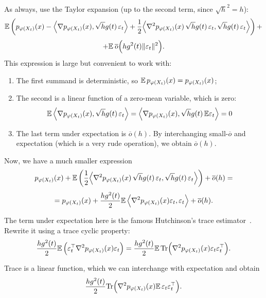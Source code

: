 As always, use the Taylor expansion (up to the second term, since $\sqrt{h}^2 = h$):
\[
    \mathbb{E}\left(p_{\varphi(X_t)}(x) - \Big\langle \nabla p_{\varphi(X_t)} (x), \sqrt{h} g(t)\, \varepsilon_t  \Big\rangle + \frac{1}{2} \Big\langle \nabla^2 p_{\varphi(X_t)}(x)\, \sqrt{h}g(t)\,\varepsilon_t, \sqrt{h}g(t)\,\varepsilon_t \Big \rangle \right) + 
\]
\[
    + \mathbb{E} \:\overline{o}\Big(h g^2(t) \|\varepsilon_t \|^2\Big).
\]
This expression is large but convenient to work with:
\begin{enumerate}
    \item The first summand is deterministic, so $\mathbb{E}\, p_{\varphi(X_t)}(x) = p_{\varphi(X_t)}(x)$;
    \item The second is a linear function of a zero-mean variable, which is zero:
    \[
        \mathbb{E}\, \Big\langle \nabla p_{\varphi(X_t)} (x), \sqrt{h} g(t)\, \varepsilon_t  \Big\rangle = \Big\langle \nabla p_{\varphi(X_t)} (x), \sqrt{h} g(t)\, \mathbb{E} \varepsilon_t  \Big\rangle = 0
    \]
    \item The last term under expectation is $\overline{o}(h)$. By interchanging small-$\overline{o}$ and expectation (which is a very rude operation), we obtain $\overline{o}(h)$.
\end{enumerate}

Now, we have a much smaller expression
\[
    p_{\varphi(X_t)}(x) + \mathbb{E}\left(\frac{1}{2} \Big\langle \nabla^2 p_{\varphi(X_t)}(x)\, \sqrt{h}g(t)\,\varepsilon_t, \sqrt{h}g(t)\,\varepsilon_t \Big \rangle \right) + \overline{o}(h) = 
\]
\[
    = p_{\varphi(X_t)}(x) + \frac{h g^2(t)}{2} \mathbb{E} \,\Big\langle \nabla^2 p_{\varphi(X_t)}(x) \varepsilon_t, \varepsilon_t \Big\rangle + \overline{o}(h).
\]

The term under expectation here is the famous Hutchinson's trace estimator~\cite{hutchinson1989stochastic}. Rewrite it using a trace cyclic property:
    \[
        \frac{h g^2(t)}{2} \mathbb{E} \, \Big(\varepsilon_t^{\top} \nabla^2 p_{\varphi(X_t)}(x) \varepsilon_t \Big) = \frac{h g^2(t)}{2} \mathbb{E}\, \mathrm{Tr} \Big(\nabla^2 p_{\varphi(X_t)}(x) \varepsilon_t \varepsilon_t^\top \Big).
    \]

Trace is a linear function, which we can interchange with expectation and obtain
\[
    \frac{h g^2(t)}{2} \mathrm{Tr}\Big(\nabla^2 p_{\varphi(X_t)}(x) \mathbb{E}\, \varepsilon_t \varepsilon_t^\top \Big).
\]

